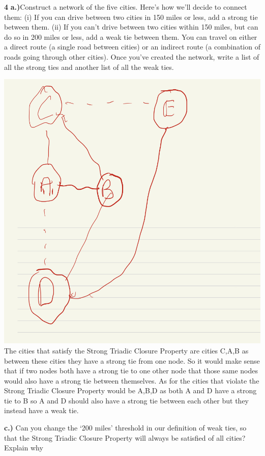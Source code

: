 \documentclass[
]{article}
\begin{document}
\textbf{4} \textbf{a.)}Construct a network of the five cities. Here's
how we'll decide to connect them: (i) If you can drive between two
cities in 150 miles or less, add a strong tie between them. (ii) If you
can't drive between two cities within 150 miles, but can do so in 200
miles or less, add a weak tie between them. You can travel on either a
direct route (a single road between cities) or an indirect route (a
combination of roads going through other cities). Once you've created
the network, write a list of all the strong ties and another list of all
the weak ties.

\includegraphics{graph3.jpg} The cities that satisfy the Strong Triadic
Closure Property are cities C,A,B as between these cities they have a
strong tie from one node. So it would make sense that if two nodes both
have a strong tie to one other node that those same nodes would also
have a strong tie between themselves. As for the cities that violate the
Strong Triadic Closure Property would be A,B,D as both A and D have a
strong tie to B so A and D should also have a strong tie between each
other but they instead have a weak tie.

\textbf{c.)} Can you change the `200 miles' threshold in our definition
of weak ties, so that the Strong Triadic Closure Property will always be
satisfied of all cities? Explain why
\end{document}
